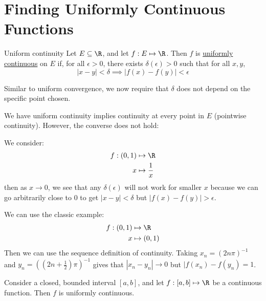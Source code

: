 \documentclass[../Main.tex]{subfiles}
\begin{document}
\section{Finding Uniformly Continuous Functions}
\begin{definition}{Uniform continuity}
    Let $E \subseteq \R$, and let $f : E \mapsto \R$. Then $f$ is \underline{uniformly continuous} on $E$ if, for all $\epsilon > 0$, there exists $\delta(\epsilon) > 0$ such that for all $x, y$,
    \begin{equation*}
        |x - y| < \delta \implies |f(x) - f(y)| < \epsilon
    \end{equation*}
\end{definition}
\begin{remark}
    Similar to uniform convergence, we now require that $\delta$ does not depend on the specific point chosen.
\end{remark}
We have uniform continuity implies continuity at every point in $E$ (pointwise continuity). However, the converse does not hold:
\begin{example}
    We consider:
    \begin{align*}
        f : (0, 1) &\mapsto \R\\
        x &\mapsto \frac{1}{x}
    \end{align*}
    then as $x \to 0$, we see that any $\delta(\epsilon)$ will not work for smaller $x$ because we can go arbitrarily close to $0$ to get $|x-y| < \delta$ but $|f(x) - f(y)| > \epsilon$.
\end{example}
\begin{example}
    We can use the classic example:
    \begin{align*}
        f : (0, 1) &\mapsto \R\\
        x &\mapsto (0, 1)
    \end{align*}
    Then we can use the sequence definition of continuity. Taking $x_n = (2n\pi)^{-1}$ and $y_n = ((2n + \frac12)\pi)^{-1}$ gives that $|x_n - y_n| \to 0$ but $|f(x_n) - f(y_n) = 1$.
\end{example}
\begin{theorem}
    Consider a closed, bounded interval $[a, b]$, and let $f : [a, b] \mapsto \R$ be a continuous function. Then $f$ is uniformly continuous.
    \label{thmUCTClosedBdd}
\end{theorem}
\end{document}
